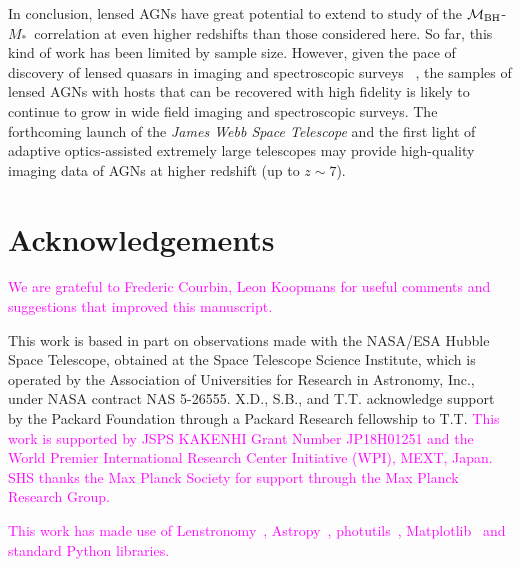 \documentclass[fleqn,usenatbib]{mnras}
\newcommand{\mbh}{$\mathcal M_{\rm BH}$}
\newcommand{\lenstronomy}{{\sc Lenstronomy}}
\newcommand{\mstar}{{$M_*$}}
\newcommand{\pink}[1]{{\textcolor{magenta}{#1}}}
\begin{document}
In conclusion, lensed AGNs have great potential to extend to study of the \mbh-\mstar\ correlation at even higher redshifts than those considered here.  So far, this kind of work has been limited by sample size. However, given the pace of discovery of lensed quasars in imaging and spectroscopic surveys ~\citep[e.g.,][]{Oguri2010, Agn++15,Mor++16,Sch++16,Ost++17,Tre++18, Ang++18, Lem++20}, the samples of lensed AGNs with hosts that can be recovered with high fidelity is likely to continue to grow in wide field imaging and spectroscopic surveys. The forthcoming launch of the {\it James Webb Space Telescope} and the first light of adaptive optics-assisted extremely large telescopes may provide high-quality imaging data of AGNs at higher redshift (up to $z\sim7$).

\section*{Acknowledgements}
\pink{We are grateful to Frederic Courbin, Leon Koopmans for useful comments
and suggestions that improved this manuscript.}

This work is based in part on observations made with the NASA/ESA Hubble Space Telescope, obtained at the Space Telescope Science Institute, which is operated by the Association of Universities for Research in Astronomy, Inc., under NASA contract NAS 5-26555. X.D., S.B., and T.T. acknowledge support by the Packard Foundation through a Packard Research fellowship to T.T. \pink{This work is supported by JSPS KAKENHI Grant Number JP18H01251 and the World Premier International Research Center Initiative (WPI), MEXT, Japan. SHS thanks the Max Planck Society for support through the Max Planck Research Group.} 

\pink{This work has made use of \lenstronomy~\citep{lenstronomy}, {\sc Astropy}~\citep{Astropy}, {\sc photutils}~\citep{photutils}, {\sc Matplotlib}~\citep{Matplotlib} and standard Python libraries.}







\end{document}
